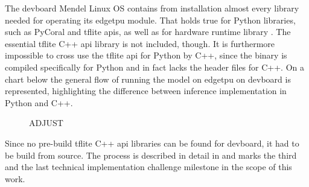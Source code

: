 {The \gls{devboard} Mendel Linux OS contains from installation almost every library needed for operating its \gls{edgetpu} module.
That holds true for Python libraries, such as PyCoral and \gls{tflite} \glspl{api}, as well as for hardware runtime library .
The essential \gls{tflite} C++ \gls{api} library is not included, though.
It is furthermore impossible to cross use the \gls{tflite} \gls{api} for Python by C++,
since the binary is compiled specifically for Python and in fact lacks the header files for C++.
On a chart below the general flow of running the model on \gls{edgetpu} on \gls{devboard} is represented,
highlighting the difference between inference implementation in Python and C++.

\begin{figure}[H]
\centering
{}
\caption{ADJUST}
\end{figure}

Since no pre-build \gls{tflite} C++ \gls{api} libraries can be found for \gls{devboard}, it had to be build from source.
The process is described in detail in 
and marks the third and the last technical implementation challenge milestone in the scope of this work.

}
